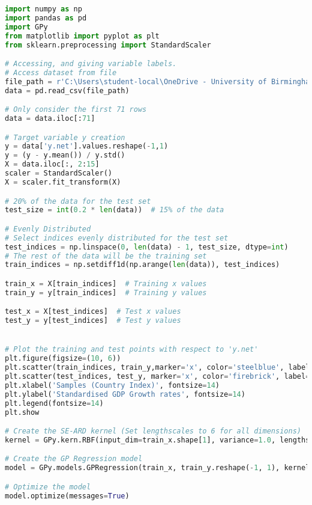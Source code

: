 \documentclass[12pt,a4paper]{article}
\begin{document}
\vspace{10pt}
\begin{lstlisting}[language=python, caption={Code of the Creation of Figures\ref{fig:SE-ARD barro dataset plot},\ref{fig:SE-ARD barro correlation (test) plot}, \ref{fig:SE-ARD barro GPregression plot}}]
import numpy as np
import pandas as pd
import GPy
from matplotlib import pyplot as plt
from sklearn.preprocessing import StandardScaler

# Accessing, and giving variable labels.
# Access dataset from file
file_path = r'C:\Users\student-local\OneDrive - University of Birmingham\Dissertation\barro.csv'
data = pd.read_csv(file_path)

# Only consider the first 71 rows
data = data.iloc[:71]

# Target variable y creation
y = data['y.net'].values.reshape(-1,1)
y = (y - y.mean()) / y.std()
X = data.iloc[:, 2:15]
scaler = StandardScaler()
X = scaler.fit_transform(X)

# 20% of the data for the test set
test_size = int(0.2 * len(data))  # 15% of the data

# Evenly Distributed
# Select indices evenly distributed for the test set
test_indices = np.linspace(0, len(data) - 1, test_size, dtype=int)
# The rest of the data will be the training set
train_indices = np.setdiff1d(np.arange(len(data)), test_indices)

train_x = X[train_indices]  # Training x values
train_y = y[train_indices]  # Training y values

test_x = X[test_indices]  # Test x values
test_y = y[test_indices]  # Test y values


# Plot the training and test points with respect to 'y.net'
plt.figure(figsize=(10, 6))
plt.scatter(train_indices, train_y,marker='x', color='steelblue', label='Training Data', s=50)
plt.scatter(test_indices, test_y, marker='x', color='firebrick', label='Test Data', s=50)
plt.xlabel('Samples (Country Index)', fontsize=14)
plt.ylabel('Standardised GDP Growth rates', fontsize=14)
plt.legend(fontsize=14)
plt.show

# Create the SE-ARD kernel (Set lengthscales to 6 for all dimensions)
kernel = GPy.kern.RBF(input_dim=train_x.shape[1], variance=1.0, lengthscale=np.full(train_x.shape[1], 6), ARD=True)

# Create the GP Regression model
model = GPy.models.GPRegression(train_x, train_y.reshape(-1, 1), kernel)

# Optimize the model
model.optimize(messages=True)


\end{lstlisting}
\end{document}
